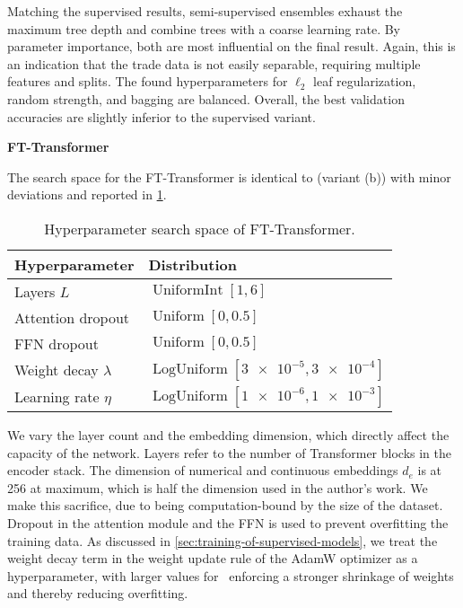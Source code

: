 Matching the supervised results, semi-supervised ensembles exhaust the maximum tree depth and combine trees with a coarse learning rate. By parameter importance, both are most influential on the final result. Again, this is an indication that the trade data is not easily separable, requiring multiple features and splits. The found hyperparameters for $\ell_2$ leaf regularization, random strength, and bagging are balanced. Overall, the best validation accuracies are slightly inferior to the supervised variant.


\textbf{FT-Transformer}

The search space for the FT-Transformer is identical to \textcite[][sup.]{gorishniyRevisitingDeepLearning2021} (variant (b)) with minor deviations and reported in \cref{tab:hyperparameter-space-2}.

\begin{table}[!ht]
    \centering
    \caption[Hyperparameter Search Space of FT-Transformer]{Hyperparameter search space of FT-Transformer.}
    \label{tab:hyperparameter-space-2}
    \begin{tabular}{@{}ll@{}}
        \toprule
        Hyperparameter         & Distribution                                        \\ \midrule
        Layers $L$             & $\operatorname{UniformInt}[1,6]$                    \\
        Attention dropout      & $\operatorname{Uniform}[0, 0.5]$                    \\
        \gls{FFN} dropout      & $\operatorname{Uniform}[0, 0.5]$                    \\
        Weight decay $\lambda$ & $\operatorname{LogUniform}[\num{3e-5}, \num{3e-4}]$ \\
        Learning rate $\eta$   & $\operatorname{LogUniform}[\num{1e-6}, \num{1e-3}]$ \\ \bottomrule
    \end{tabular}
\end{table}

We vary the layer count and the embedding dimension, which directly affect the capacity of the network. Layers refer to the number of Transformer blocks in the encoder stack. The dimension of numerical and continuous embeddings $d_e$ is at \num{256} at maximum, which is half the dimension used in the author's work. We make this sacrifice, due to being computation-bound by the size of the dataset. Dropout in the attention module and the \gls{FFN} is used to prevent overfitting the training data. As discussed in \cref{sec:training-of-supervised-models}, we treat the weight decay term in the weight update rule of the AdamW optimizer as a hyperparameter, with larger values for \lambda~enforcing a stronger shrinkage of weights and thereby reducing overfitting.

